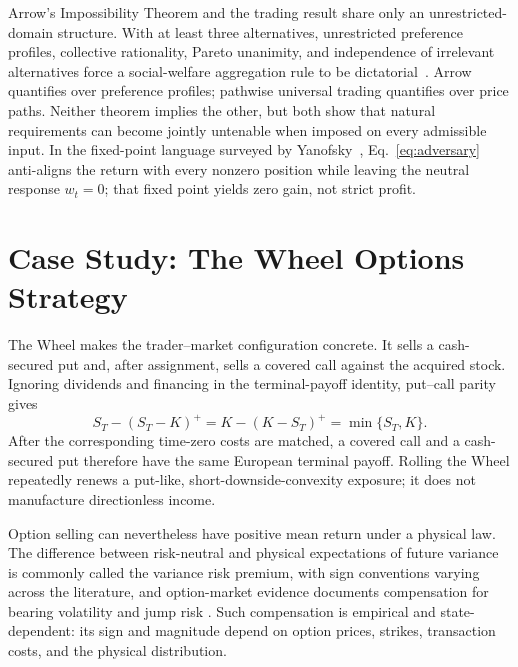 \documentclass[aps,pra,reprint,superscriptaddress,amsmath,amssymb,floatfix]{revtex4-2}
\theoremstyle{plain}
\theoremstyle{definition}
\theoremstyle{remark}
\begin{document}
Arrow's Impossibility Theorem and the trading result share only an
unrestricted-domain structure. With at least three alternatives, unrestricted
preference profiles, collective rationality, Pareto unanimity, and independence
of irrelevant alternatives force a social-welfare aggregation rule to be
dictatorial~\cite{Arrow1963}. Arrow quantifies over preference profiles;
pathwise universal trading quantifies over price paths. Neither theorem implies
the other, but both show that natural requirements can become jointly
untenable when imposed on every admissible input. In the fixed-point language
surveyed by Yanofsky~\cite{Yanofsky-BSL:9051621},
Eq.~\eqref{eq:adversary} anti-aligns the return with every nonzero position
while leaving the neutral response \(w_t=0\); that fixed point yields zero
gain, not strict profit.

\section{Case Study: The Wheel Options Strategy}
\label{sec:wheel}

The Wheel makes the trader--market configuration concrete. It sells a
cash-secured put and, after assignment, sells a covered call against the
acquired stock. Ignoring dividends and financing in the terminal-payoff
identity, put--call parity gives
\begin{equation}
  S_T-(S_T-K)^+
  =K-(K-S_T)^+
  =\min\{S_T,K\}.
  \label{eq:putcall}
\end{equation}
After the corresponding time-zero costs are matched, a covered call and a
cash-secured put therefore have the same European terminal payoff. Rolling the
Wheel repeatedly renews a put-like, short-downside-convexity exposure; it does
not manufacture directionless income.

Option selling can nevertheless have positive mean return under a physical
law. The
difference between risk-neutral and physical expectations of future variance
is commonly called the variance risk premium, with sign conventions varying
across the literature, and option-market evidence documents compensation for
bearing volatility and jump risk
\cite{BakshiKapadia2003,CarrWu2009}. Such compensation is empirical and
state-dependent: its sign and magnitude depend on option prices, strikes,
transaction costs, and the physical distribution.
\end{document}
